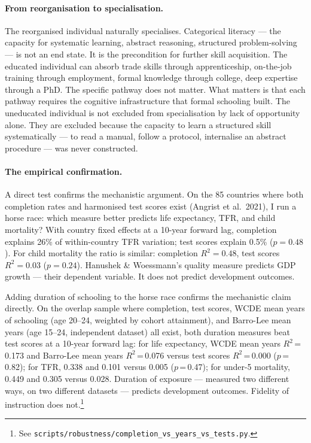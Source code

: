 \documentclass[12pt,letterpaper]{article}
\begin{document}
\paragraph{From reorganisation to specialisation.}

The reorganised individual naturally specialises. Categorical literacy
--- the capacity for systematic learning, abstract reasoning, structured
problem-solving --- is not an end state. It is the precondition for
further skill acquisition. The educated individual can absorb trade
skills through apprenticeship, on-the-job training through employment,
formal knowledge through college, deep expertise through a PhD. The
specific pathway does not matter. What matters is that each pathway
requires the cognitive infrastructure that formal schooling built. The
uneducated individual is not excluded from specialisation by lack of
opportunity alone. They are excluded because the capacity to learn a
structured skill systematically --- to read a manual, follow a protocol,
internalise an abstract procedure --- was never constructed.

\paragraph{The empirical confirmation.}

A direct test confirms the mechanistic argument. On the 85 countries
where both completion rates and harmonised test scores exist (Angrist et
al.~2021), I run a horse race: which measure better predicts life
expectancy, TFR, and child mortality? With country fixed effects at a
10-year forward lag, completion explains 26\% of within-country TFR
variation; test scores explain 0.5\% ($p = 0.48$). For child mortality
the ratio is similar: completion $R^2 = 0.48$, test scores $R^2 = 0.03$
($p = 0.24$). Hanushek \& Woessmann's quality measure predicts GDP
growth --- their dependent variable. It does not predict development
outcomes.

Adding duration of schooling to the horse race confirms the mechanistic
claim directly. On the overlap sample where completion, test scores,
WCDE mean years of schooling (age 20--24, weighted by cohort
attainment), and Barro-Lee mean years (age 15--24, independent dataset)
all exist, both duration measures beat test scores at a 10-year forward
lag: for life expectancy, WCDE mean years $R^2$\,=\,0.173 and Barro-Lee
mean years $R^2$\,=\,0.076 versus test scores $R^2$\,=\,0.000
($p$\,=\,0.82); for TFR, 0.338 and 0.101 versus 0.005 ($p$\,=\,0.47);
for under-5 mortality, 0.449 and 0.305 versus 0.028. Duration of
exposure --- measured two different ways, on two different datasets ---
predicts development outcomes. Fidelity of instruction does not.\footnote{See
\texttt{scripts/robustness/completion\_vs\_years\_vs\_tests.py}.}
\end{document}
